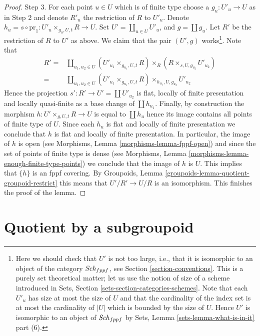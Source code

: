 \begin{proof}
\medskip\noindent
Step 3. For each point $u \in U$ which is of finite type
choose a $g_u : U'_u \to U$ as in
Step 2 and denote $R'_u$ the restriction of $R$ to $U'_u$.
Denote $h_u = s \circ \text{pr}_1 : U'_u \times_{g_u, U, t} R \to U$. Set
$U' = \coprod_{u \in U} U'_u$, and $g = \coprod g_u$. Let $R'$ be the
restriction of $R$ to $U'$ as above. We claim that
the pair $(U', g)$ works\footnote{Here we should check that $U'$ is not
too large, i.e., that it is isomorphic to an object of the category
$\mathit{Sch}_{fppf}$, see
Section \ref{section-conventions}.
This is a purely set theoretical matter; let us use the notion of size of
a scheme introduced in
Sets, Section \ref{sets-section-categories-schemes}.
Note that each $U'_u$ has size at most the size of $U$
and that the cardinality of the index set is at most the cardinality of
$|U|$ which is bounded by the size of $U$. Hence $U'$ is isomorphic
to an object of $\mathit{Sch}_{fppf}$ by
Sets, Lemma \ref{sets-lemma-what-is-in-it} part (6).}.
Note that
\begin{align*}
R' = &
\coprod\nolimits_{u_1, u_2 \in U}
(U'_{u_1} \times_{g_{u_1}, U, t} R)
\times_R
(R \times_{s, U, g_{u_2}} U'_{u_2}) \\
= &
\coprod\nolimits_{u_1, u_2 \in U}
(U'_{u_1} \times_{g_{u_1}, U, t} R) \times_{h_{u_1}, U, g_{u_2}} U'_{u_2}
\end{align*}
Hence the projection $s' : R' \to U' = \coprod U'_{u_2}$
is flat, locally of finite
presentation and locally quasi-finite as a base change of $\coprod h_{u_1}$.
Finally, by construction the morphism
$h : U' \times_{g, U, t} R \to U$ is equal to $\coprod h_u$ hence
its image contains all points of finite type of $U$.
Since each $h_u$ is flat and locally of finite presentation we conclude that
$h$ is flat and locally of finite presentation.
In particular, the image of $h$ is open (see
Morphisms, Lemma \ref{morphisms-lemma-fppf-open})
and since the set of points of finite type is dense (see
Morphisms, Lemma \ref{morphisms-lemma-enough-finite-type-points})
we conclude that the image of $h$ is $U$. This implies that
$\{h\}$ is an fppf covering. By
Groupoids, Lemma \ref{groupoids-lemma-quotient-groupoid-restrict}
this means that $U'/R' \to U/R$ is an isomorphism.
This finishes the proof of the lemma.
\end{proof}










\section{Quotient by a subgroupoid}
\label{section-dividing}

